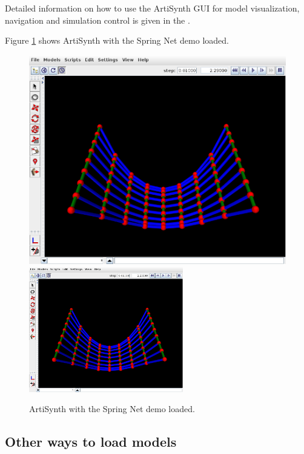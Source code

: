 \fi

Detailed information on how to use the ArtiSynth GUI for model
visualization, navigation and simulation control is given in the
.

Figure \ref{SpringNetDemo:fig} shows ArtiSynth with the {\sf Spring
Net} demo loaded.

\begin{figure}[ht]
\begin{center}
\iflatexml
   \includegraphics[]{images/SpringNetDemo}
\else
   \includegraphics[width=0.60\textwidth]{images/SpringNetDemo}
\fi
\end{center}
\caption{ArtiSynth with the Spring Net demo loaded.}
\label{SpringNetDemo:fig}
\end{figure}

\subsection{Other ways to load models}

